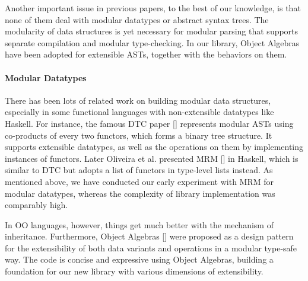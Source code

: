 Another important issue in previous papers, to the best of our knowledge, is that none of them deal with modular datatypes or abstract syntax trees.  The modularity of data structures is yet necessary for modular parsing that supports separate compilation and modular type-checking. In our library, Object Algebras have been adopted for extensible ASTs, together with the behaviors on them.

\paragraph*{Modular Datatypes} There has been lots of related work on building modular data structures, especially in some functional languages with non-extensible datatypes like Haskell. For instance, the famous DTC paper [] represents modular ASTs using co-products of every two functors, which forms a binary tree structure. It supports extensible datatypes, as well as the operations on them by implementing instances of functors. Later Oliveira et al. presented MRM [] in Haskell, which is similar to DTC but adopts a list of functors in type-level lists instead. As mentioned above, we have conducted our early experiment with MRM for modular datatypes, whereas the complexity of library implementation was comparably high.

In OO languages, however, things get much better with the mechanism of inheritance. Furthermore, Object Algebras [] were proposed as a design pattern for the extensibility of both data variants and operations in a modular type-safe way. The code is concise and expressive using Object Algebras, building a foundation for our new library with various dimensions of extensibility. 

